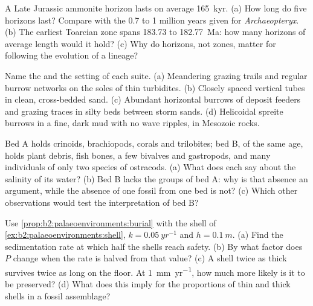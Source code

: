 \begin{exercise}[$\star$]\label{exo:b2:palaeoenvironments:2}
A Late Jurassic ammonite horizon lasts on average \qty{165}{kyr}. (a) How long do five horizons
last? Compare with the 0.7 to 1 million years given for \emph{Archaeopteryx}. (b) The earliest
Toarcian zone spans 183.73 to \qty{182.77}{Ma}: how many horizons of average length would it hold?
(c) Why do horizons, not zones, matter for following the evolution of a lineage?
\end{exercise}

\begin{exercise}[$\star$]\label{exo:b2:palaeoenvironments:3}
Name the  and the setting of each suite. (a) Meandering grazing trails and regular
burrow networks on the soles of thin turbidites. (b) Closely spaced vertical tubes in clean,
cross-bedded sand. (c) Abundant horizontal burrows of deposit feeders and grazing traces in silty
beds between storm sands. (d) Helicoidal spreite burrows in a fine, dark mud with no wave
ripples, in Mesozoic rocks.
\end{exercise}

\begin{exercise}[$\star$]\label{exo:b2:palaeoenvironments:4}
Bed A holds crinoids, brachiopods, corals and trilobites; bed B, of the same age, holds plant
debris, fish bones, a few bivalves and gastropods, and many individuals of only two species of
ostracods. (a) What does each say about the salinity of its water? (b) Bed B lacks the groups of
bed A: why is that absence an argument, while the absence of one fossil from one bed is not?
(c) Which other observations would test the interpretation of bed B?
\end{exercise}

\begin{exercise}[$\star\star$]\label{exo:b2:palaeoenvironments:5}
Use \cref{prop:b2:palaeoenvironments:burial} with the shell of
\cref{ex:b2:palaeoenvironments:shell}, $k = \qty{0.05}{yr^{-1}}$ and $h = \qty{0.1}{m}$. (a)
Find the sedimentation rate at which half the shells reach safety. (b) By what factor does $P$
change when the rate is halved from that value? (c) A shell twice as thick survives twice as long
on the floor. At \qty{1}{mm.yr^{-1}}, how much more likely is it to be preserved? (d) What does
this imply for the proportions of thin and thick shells in a fossil assemblage?
\end{exercise}

